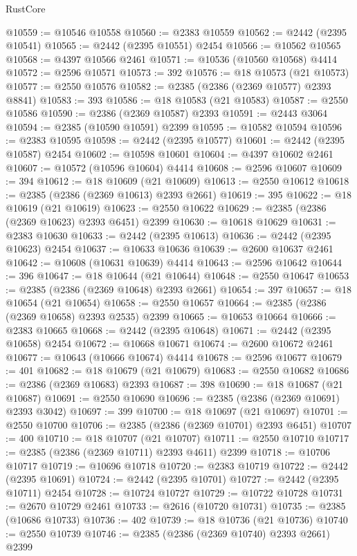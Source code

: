 \begin{lexlean}{RustCore}
\begin{coremodule}
@10559 := @10546 @10558
@10560 := @2383 @10559
@10562 := @2442 (@2395 @10541)
@10565 := @2442 (@2395 @10551) @2454
@10566 := @10562 @10565
@10568 := @4397 @10566 @2461
@10571 := @10536 (@10560 @10568) @4414
@10572 := @2596 @10571
@10573 := 392
@10576 := @18 @10573 (@21 @10573)
@10577 := @2550 @10576
@10582 := @2385 (@2386 (@2369 @10577) @2393 @8841)
@10583 := 393
@10586 := @18 @10583 (@21 @10583)
@10587 := @2550 @10586
@10590 := @2386 (@2369 @10587) @2393
@10591 := @2443 @3064
@10594 := @2385 (@10590 @10591) @2399
@10595 := @10582 @10594
@10596 := @2383 @10595
@10598 := @2442 (@2395 @10577)
@10601 := @2442 (@2395 @10587) @2454
@10602 := @10598 @10601
@10604 := @4397 @10602 @2461
@10607 := @10572 (@10596 @10604) @4414
@10608 := @2596 @10607
@10609 := 394
@10612 := @18 @10609 (@21 @10609)
@10613 := @2550 @10612
@10618 := @2385 (@2386 (@2369 @10613) @2393 @2661)
@10619 := 395
@10622 := @18 @10619 (@21 @10619)
@10623 := @2550 @10622
@10629 := @2385 (@2386 (@2369 @10623) @2393 @6451) @2399
@10630 := @10618 @10629
@10631 := @2383 @10630
@10633 := @2442 (@2395 @10613)
@10636 := @2442 (@2395 @10623) @2454
@10637 := @10633 @10636
@10639 := @2600 @10637 @2461
@10642 := @10608 (@10631 @10639) @4414
@10643 := @2596 @10642
@10644 := 396
@10647 := @18 @10644 (@21 @10644)
@10648 := @2550 @10647
@10653 := @2385 (@2386 (@2369 @10648) @2393 @2661)
@10654 := 397
@10657 := @18 @10654 (@21 @10654)
@10658 := @2550 @10657
@10664 := @2385 (@2386 (@2369 @10658) @2393 @2535) @2399
@10665 := @10653 @10664
@10666 := @2383 @10665
@10668 := @2442 (@2395 @10648)
@10671 := @2442 (@2395 @10658) @2454
@10672 := @10668 @10671
@10674 := @2600 @10672 @2461
@10677 := @10643 (@10666 @10674) @4414
@10678 := @2596 @10677
@10679 := 401
@10682 := @18 @10679 (@21 @10679)
@10683 := @2550 @10682
@10686 := @2386 (@2369 @10683) @2393
@10687 := 398
@10690 := @18 @10687 (@21 @10687)
@10691 := @2550 @10690
@10696 := @2385 (@2386 (@2369 @10691) @2393 @3042)
@10697 := 399
@10700 := @18 @10697 (@21 @10697)
@10701 := @2550 @10700
@10706 := @2385 (@2386 (@2369 @10701) @2393 @6451)
@10707 := 400
@10710 := @18 @10707 (@21 @10707)
@10711 := @2550 @10710
@10717 := @2385 (@2386 (@2369 @10711) @2393 @4611) @2399
@10718 := @10706 @10717
@10719 := @10696 @10718
@10720 := @2383 @10719
@10722 := @2442 (@2395 @10691)
@10724 := @2442 (@2395 @10701)
@10727 := @2442 (@2395 @10711) @2454
@10728 := @10724 @10727
@10729 := @10722 @10728
@10731 := @2670 @10729 @2461
@10733 := @2616 (@10720 @10731)
@10735 := @2385 (@10686 @10733)
@10736 := 402
@10739 := @18 @10736 (@21 @10736)
@10740 := @2550 @10739
@10746 := @2385 (@2386 (@2369 @10740) @2393 @2661) @2399

\end{coremodule}
\end{lexlean}
